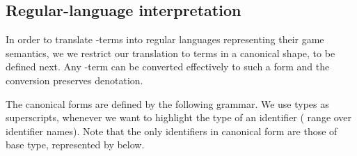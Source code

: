 \documentclass{CSML}
\theoremstyle{definition}\newtheorem{definition}[thm]{Definition}
\theoremstyle{definition}\newtheorem{example}[thm]{Example}
\theoremstyle{definition}\newtheorem{proposition}[thm]{Proposition}
\theoremstyle{definition}\newtheorem{lemma}[thm]{Lemma}
\theoremstyle{definition}\newtheorem{theorem}[thm]{Theorem}
\theoremstyle{definition}\newtheorem{corollary}[thm]{Corollary}
\theoremstyle{definition}\newtheorem{remark}[thm]{Remark}
\begin{document}
\subsection{Regular-language interpretation}

In order to translate -terms into regular languages representing their game semantics, we 
we restrict our translation to terms in a canonical shape, to be defined next. 
Any -term can be converted effectively to such a form and the conversion
preserves denotation.

The canonical forms are defined by the following grammar. We use types as 
superscripts, whenever we want to highlight the type of an identifier ( 
range over identifier names). Note that the only identifiers in canonical form are those of base type, 
represented by   below.
\end{document}
